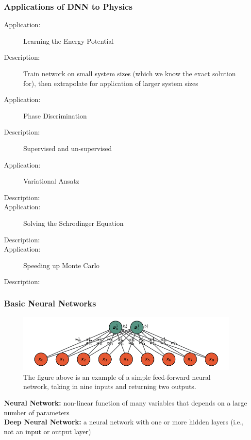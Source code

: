 \subsubsection{Applications of DNN to Physics}
\begin{description}
\item [Application:] Learning the Energy Potential
\item [Description:] Train network on small system sizes (which we know the exact solution for), then extrapolate for application of larger system sizes 

\item [Application:] Phase Discrimination
\item [Description:] Supervised and un-supervised 

\item[Application:] Variational Ansatz 
\item[Description:] 

\item [Application:] Solving the Schrodinger Equation
\item[Description:] 

\item [Application:] Speeding up Monte Carlo
\item [Description:] 
\end{description}

\subsubsection{Basic Neural Networks}
\begin{figure}[H]
\centering
\includegraphics{../figures/neural_network.pdf}
\caption{The figure above is an example of a simple feed-forward neural network, taking in nine inputs and returning two outputs.}
\end{figure}

\noindent \textbf{Neural Network:} non-linear function of many variables that depends on a large number of parameters \\
\textbf{Deep Neural Network:} a neural network with one or more hidden layers (i.e., not an input or output layer)

